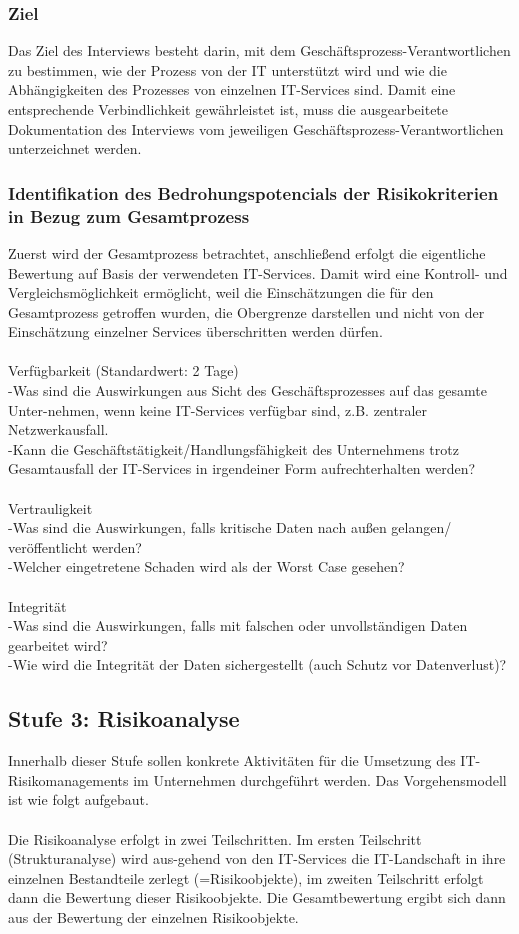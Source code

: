 \subsubsection{Ziel}
Das Ziel des Interviews besteht darin, mit dem Geschäftsprozess-Verantwortlichen zu bestimmen, wie der Prozess von der IT unterstützt wird und wie die Abhängigkeiten des Prozesses von einzelnen IT-Services sind. Damit eine entsprechende Verbindlichkeit gewährleistet ist, muss die ausgearbeitete Dokumentation des Interviews vom jeweiligen Geschäftsprozess-Verantwortlichen unterzeichnet werden.

\subsubsection{Identifikation des Bedrohungspotencials der Risikokriterien in Bezug zum Gesamtprozess}
Zuerst wird der Gesamtprozess betrachtet, anschließend erfolgt die eigentliche Bewertung auf Basis der verwendeten IT-Services. Damit wird eine Kontroll- und Vergleichsmöglichkeit ermöglicht, weil die Einschätzungen die für den Gesamtprozess getroffen wurden, die Obergrenze darstellen und nicht von der Einschätzung einzelner Services überschritten werden dürfen.\\
\\Verfügbarkeit (Standardwert: 2 Tage)
\\-Was sind die Auswirkungen aus Sicht des Geschäftsprozesses auf das gesamte Unter-nehmen, wenn keine IT-Services verfügbar sind, z.B. zentraler Netzwerkausfall.\\
-Kann die Geschäftstätigkeit/Handlungsfähigkeit des Unternehmens trotz Gesamtausfall der IT-Services in irgendeiner Form aufrechterhalten werden?\\
\\Vertrauligkeit
\\-Was sind die Auswirkungen, falls kritische Daten nach außen gelangen/ veröffentlicht werden?
\\-Welcher eingetretene Schaden wird als der Worst Case gesehen?\\
\\Integrität
\\-Was sind die Auswirkungen, falls mit falschen oder unvollständigen Daten gearbeitet wird?
\\-Wie wird die Integrität der Daten sichergestellt (auch Schutz vor Datenverlust)?
\subsection{Stufe 3: Risikoanalyse}
Innerhalb dieser Stufe sollen konkrete Aktivitäten für die Umsetzung des IT-Risikomanagements im Unternehmen durchgeführt werden. Das Vorgehensmodell ist wie folgt aufgebaut.\\
\\Die Risikoanalyse erfolgt in zwei Teilschritten. Im ersten Teilschritt (Strukturanalyse) wird aus-gehend von den IT-Services die IT-Landschaft in ihre einzelnen Bestandteile zerlegt (=Risikoobjekte), im zweiten Teilschritt erfolgt dann die Bewertung dieser Risikoobjekte. Die Gesamtbewertung ergibt sich dann aus der Bewertung der einzelnen Risikoobjekte.
